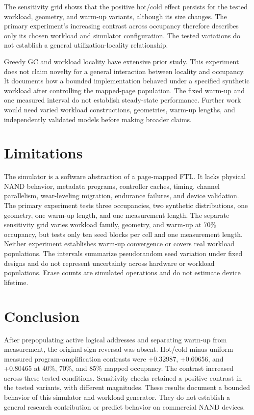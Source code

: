\documentclass[11pt]{article}
\begin{document}
The sensitivity grid shows that the positive hot/cold effect persists for the tested workload, geometry, and warm-up variants, although its size changes. The primary experiment's increasing contrast across occupancy therefore describes only its chosen workload and simulator configuration. The tested variations do not establish a general utilization-locality relationship.

Greedy GC and workload locality have extensive prior study. This experiment does not claim novelty for a general interaction between locality and occupancy. It documents how a bounded implementation behaved under a specified synthetic workload after controlling the mapped-page population. The fixed warm-up and one measured interval do not establish steady-state performance. Further work would need varied workload constructions, geometries, warm-up lengths, and independently validated models before making broader claims.

\section{Limitations}
The simulator is a software abstraction of a page-mapped FTL. It lacks physical NAND behavior, metadata programs, controller caches, timing, channel parallelism, wear-leveling migration, endurance failures, and device validation. The primary experiment tests three occupancies, two synthetic distributions, one geometry, one warm-up length, and one measurement length. The separate sensitivity grid varies workload family, geometry, and warm-up at 70\% occupancy, but tests only ten seed blocks per cell and one measurement length. Neither experiment establishes warm-up convergence or covers real workload populations. The intervals summarize pseudorandom seed variation under fixed designs and do not represent uncertainty across hardware or workload populations. Erase counts are simulated operations and do not estimate device lifetime.

\section{Conclusion}
After prepopulating active logical addresses and separating warm-up from measurement, the original sign reversal was absent. Hot/cold-minus-uniform measured program-amplification contrasts were +0.32987, +0.60656, and +0.80465 at 40\%, 70\%, and 85\% mapped occupancy. The contrast increased across these tested conditions. Sensitivity checks retained a positive contrast in the tested variants, with different magnitudes. These results document a bounded behavior of this simulator and workload generator. They do not establish a general research contribution or predict behavior on commercial NAND devices.
\end{document}
